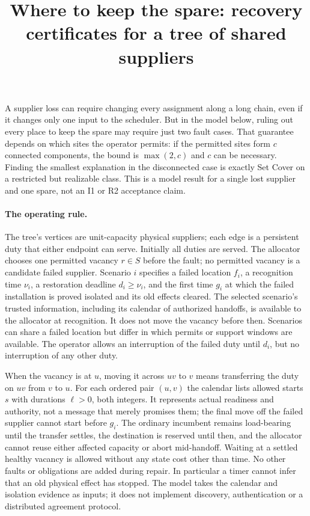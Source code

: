 \documentclass[11pt]{article}
\title{Where to keep the spare: recovery certificates for a tree of shared suppliers}
\author{}
\date{}
\begin{document}
\maketitle

A supplier loss can require changing every assignment along a long chain, even if it changes only one input to the scheduler. But in the model below, ruling out every place to keep the spare may require just two fault cases. That guarantee depends on which sites the operator permits: if the permitted sites form $c$ connected components, the bound is $\max(2,c)$ and $c$ can be necessary. Finding the smallest explanation in the disconnected case is exactly Set Cover on a restricted but realizable class. This is a model result for a single lost supplier and one spare, not an I1 or R2 acceptance claim.

\paragraph{The operating rule.}
The tree's vertices are unit-capacity physical suppliers; each edge is a persistent duty that either endpoint can serve. Initially all duties are served. The allocator chooses one permitted vacancy $r\in S$ before the fault; no permitted vacancy is a candidate failed supplier. Scenario $i$ specifies a failed location $f_i$, a recognition time $\nu_i$, a restoration deadline $d_i\geq\nu_i$, and the first time $g_i$ at which the failed installation is proved isolated and its old effects cleared. The selected scenario's trusted information, including its calendar of authorized handoffs, is available to the allocator at recognition. It does not move the vacancy before then. Scenarios can share a failed location but differ in which permits or support windows are available. The operator allows an interruption of the failed duty until $d_i$, but no interruption of any other duty.

When the vacancy is at $u$, moving it across $uv$ to $v$ means transferring the duty on $uv$ from $v$ to $u$. For each ordered pair $(u,v)$ the calendar lists allowed starts $s$ with durations $\ell>0$, both integers. It represents actual readiness and authority, not a message that merely promises them; the final move off the failed supplier cannot start before $g_i$. The ordinary incumbent remains load-bearing until the transfer settles, the destination is reserved until then, and the allocator cannot reuse either affected capacity or abort mid-handoff. Waiting at a settled healthy vacancy is allowed without any state cost other than time. No other faults or obligations are added during repair. In particular a timer cannot infer that an old physical effect has stopped. The model takes the calendar and isolation evidence as inputs; it does not implement discovery, authentication or a distributed agreement protocol.
\end{document}
